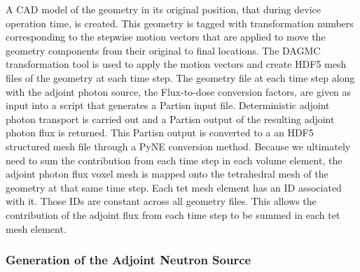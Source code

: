 A CAD model of the geometry in its original position, that during device
operation time, is created.  This geometry is tagged with transformation
numbers corresponding to the stepwise motion vectors that are applied to move the
geometry components from their original to final locations.  The DAGMC
transformation tool is used to apply the motion vectors and create HDF5 mesh
files of the geometry at each time step.   
The geometry file at each time step along with the adjoint photon source, the
Flux-to-dose conversion factors, are given as input into a script that
generates a Partisn input file.  Deterministic adjoint photon transport is
carried out and a Partisn output of the resulting adjoint photon flux is
returned.  This Partisn output is converted to a an HDF5 structured mesh file
through a PyNE conversion method.  
Because we ultimately need to sum the contribution from each time step in each
volume element, the adjoint photon flux voxel mesh is mapped onto the
tetrahedral mesh of the geometry at that same time step.  Each tet
mesh element has an ID associated with it.  Those IDs are constant across all
geometry files.  This allows the contribution of the adjoint flux from each time step
to be summed in each tet mesh element.


\subsubsection{Generation of the Adjoint Neutron Source}

